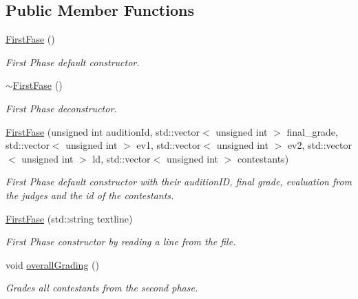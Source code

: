 \subsection*{Public Member Functions}
\begin{DoxyCompactItemize}
\item 
\mbox{\label{class_first_fase_ac4d46aed7836ccf7aea32a3f8151b1f9}} 
\hyperlink{class_first_fase_ac4d46aed7836ccf7aea32a3f8151b1f9}{First\+Fase} ()
\begin{DoxyCompactList}\small\item\em First Phase default constructor. \end{DoxyCompactList}\item 
\mbox{\label{class_first_fase_abd5896944b1d4b9c78e3c6948d2d5f12}} 
\hyperlink{class_first_fase_abd5896944b1d4b9c78e3c6948d2d5f12}{$\sim$\+First\+Fase} ()
\begin{DoxyCompactList}\small\item\em First Phase deconstructor. \end{DoxyCompactList}\item 
\hyperlink{class_first_fase_a9b46c60a282c00766e0a13c097cc1813}{First\+Fase} (unsigned int audition\+Id, std\+::vector$<$ unsigned int $>$ final\+\_\+grade, std\+::vector$<$ unsigned int $>$ ev1, std\+::vector$<$ unsigned int $>$ ev2, std\+::vector$<$ unsigned int $>$ ld, std\+::vector$<$ unsigned int $>$ contestants)
\begin{DoxyCompactList}\small\item\em First Phase default constructor with their audition\+ID, final grade, evaluation from the judges and the id of the contestants. \end{DoxyCompactList}\item 
\hyperlink{class_first_fase_a09b65ade0691df1fc27835c31b9cdf1e}{First\+Fase} (std\+::string textline)
\begin{DoxyCompactList}\small\item\em First Phase constructor by reading a line from the file. \end{DoxyCompactList}\item 
\mbox{\label{class_first_fase_aa82395cf4d06599698b7c7708b00f132}} 
void \hyperlink{class_first_fase_aa82395cf4d06599698b7c7708b00f132}{overall\+Grading} ()
\begin{DoxyCompactList}\small\item\em Grades all contestants from the second phase. \end{DoxyCompactList}\end{DoxyCompactItemize}
